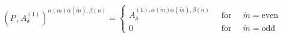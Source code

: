 \begin{equation}
\left(P_+A_\delta^{(1)}\right)^{\alpha(m)
\dot\alpha(\tilde m),\beta(n)}=\left\{\begin{array}{ccc}A_\delta^{(1),\alpha(m)
\dot\alpha(\tilde m),\beta(n)}\;\;&\mbox{for}&\;\;\tilde m=\mbox{even}\\
0\;\;&\mbox{for}&\;\;\tilde m=\mbox{odd}\end{array}\right.
\end{equation}

